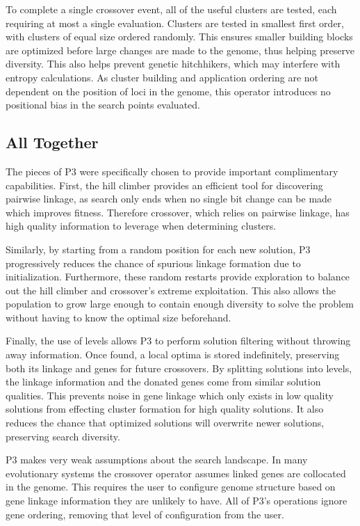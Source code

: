\documentclass{sig-alternate}
\begin{document}
To complete a single crossover event, all of the useful clusters are tested, each
requiring at most a single evaluation.  Clusters are tested in smallest first order,
with clusters of equal size ordered randomly.  This ensures smaller building blocks
are optimized before large changes are made to the genome, thus helping preserve
diversity.  This also helps prevent genetic hitchhikers, which may interfere with
entropy calculations.  As cluster building and application ordering are not dependent on
the position of loci in the genome, this operator introduces no positional bias in the search points
evaluated.

\subsection{All Together}
\label{sec-alltogether}
The pieces of P3 were specifically chosen to provide important complimentary capabilities.  First,
the hill climber provides an efficient tool for discovering pairwise linkage, as
search only ends when no single bit change can be made which improves fitness.
Therefore crossover, which relies on pairwise linkage, has high quality information
to leverage when determining clusters.

Similarly, by starting from a random position for each new solution, P3 progressively reduces
the chance of spurious linkage formation due to initialization.  Furthermore, these random
restarts provide exploration to balance out the hill climber and crossover's extreme
exploitation.  This also allows the population to grow large enough to contain enough
diversity to solve the problem without having to know the optimal size beforehand.

Finally, the use of levels allows P3 to perform solution filtering
without throwing away information.  Once found, a local optima is
stored indefinitely, preserving both its linkage and genes for future
crossovers.  By splitting solutions into levels, the linkage
information and the donated genes come from similar solution
qualities.  This prevents noise in gene linkage which only exists in
low quality solutions from effecting cluster formation for high
quality solutions.  It also reduces the chance that optimized
solutions will overwrite newer solutions, preserving
search diversity.

P3 makes very weak
assumptions about the search landscape.  In many evolutionary
systems the crossover operator assumes linked genes
are collocated in the genome.  This requires the user
to configure genome structure based on gene linkage information they
are unlikely to have. All of
P3's operations ignore gene ordering, removing that level of
configuration from the user.
\end{document}

